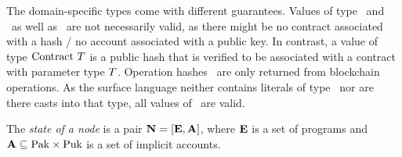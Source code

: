 \documentclass[a4paper]{llncs}
\begin{document}
The domain-specific types come with different guarantees. Values of
type \TPUH\ and \TPUK\ as well as \TADDR\ are not necessarily valid,
as there might be no contract associated with a hash / no account
associated with a public key. In contrast, a value of type
$\text{Contract}\ T$ is a public hash that is verified to be associated
with a contract with parameter type $T$. Operation hashes \OPH\
are only returned from blockchain operations. As the surface language
neither contains literals of type \TOPH\ nor are there casts into
that type, all values of \TOPH\ are valid. 

\begin{definition}%
  The \emph{state of a node} is a pair
  $\textbf{N} = [ \textbf{E}, \textbf{A}
  ]$, where $\textbf{E}$ is a
  set of programs and $\textbf{A} \subseteq \text{Pak} \times \text{Puk}$  is a set of
  implicit accounts.
\end{definition}
\end{document}
